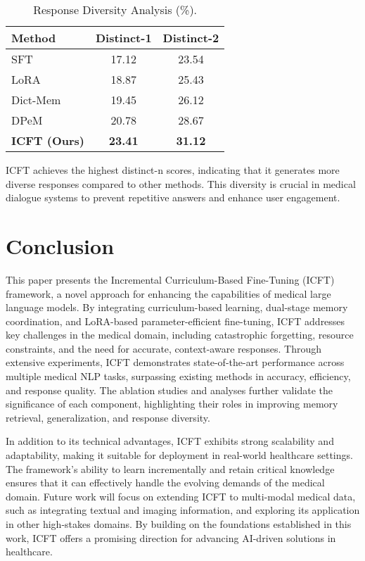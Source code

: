 \begin{table}[ht]
\centering
\caption{Response Diversity Analysis (\%).}
\label{tab:response_diversity}
\begin{tabular}{lcc}
\toprule
\textbf{Method} & \textbf{Distinct-1} & \textbf{Distinct-2} \\
\midrule
SFT               & 17.12 & 23.54 \\
LoRA              & 18.87 & 25.43 \\
Dict-Mem          & 19.45 & 26.12 \\
DPeM              & 20.78 & 28.67 \\
\textbf{ICFT (Ours)} & \textbf{23.41} & \textbf{31.12} \\
\bottomrule
\end{tabular}
\end{table}

ICFT achieves the highest distinct-n scores, indicating that it generates more diverse responses compared to other methods. This diversity is crucial in medical dialogue systems to prevent repetitive answers and enhance user engagement.

\section{Conclusion}

This paper presents the Incremental Curriculum-Based Fine-Tuning (ICFT) framework, a novel approach for enhancing the capabilities of medical large language models. By integrating curriculum-based learning, dual-stage memory coordination, and LoRA-based parameter-efficient fine-tuning, ICFT addresses key challenges in the medical domain, including catastrophic forgetting, resource constraints, and the need for accurate, context-aware responses. Through extensive experiments, ICFT demonstrates state-of-the-art performance across multiple medical NLP tasks, surpassing existing methods in accuracy, efficiency, and response quality. The ablation studies and analyses further validate the significance of each component, highlighting their roles in improving memory retrieval, generalization, and response diversity.

In addition to its technical advantages, ICFT exhibits strong scalability and adaptability, making it suitable for deployment in real-world healthcare settings. The framework's ability to learn incrementally and retain critical knowledge ensures that it can effectively handle the evolving demands of the medical domain. Future work will focus on extending ICFT to multi-modal medical data, such as integrating textual and imaging information, and exploring its application in other high-stakes domains. By building on the foundations established in this work, ICFT offers a promising direction for advancing AI-driven solutions in healthcare.

